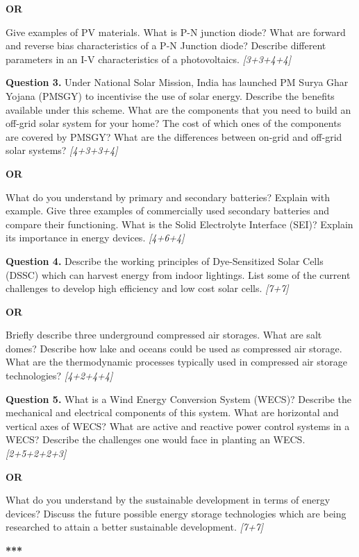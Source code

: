 \documentclass[11pt,a4paper]{article}
\newcommand{\pts}[1]{\hfill \textit{[#1]}}
\begin{document}
\begin{center}
  \textbf{OR}
\end{center}

\noindent Give examples of PV materials. What is P-N junction diode? What are forward and reverse bias characteristics of a P-N Junction diode? Describe different parameters in an I-V characteristics of a photovoltaics. \pts{3+3+4+4}

\bigskip

\noindent \textbf{Question 3.} Under National Solar Mission, India has launched PM Surya Ghar Yojana (PMSGY) to incentivise the use of solar energy. Describe the benefits available under this scheme. What are the components that you need to build an off-grid solar system for your home? The cost of which ones of the components are covered by PMSGY? What are the differences between on-grid and off-grid solar systems? \pts{4+3+3+4}

\begin{center}
  \textbf{OR}
\end{center}

\noindent What do you understand by primary and secondary batteries? Explain with example. Give three examples of commercially used secondary batteries and compare their functioning. What is the Solid Electrolyte Interface (SEI)? Explain its importance in energy devices. \pts{4+6+4}

\bigskip

\noindent \textbf{Question 4.} Describe the working principles of Dye-Sensitized Solar Cells (DSSC) which can harvest energy from indoor lightings. List some of the current challenges to develop high efficiency and low cost solar cells. \pts{7+7}

\begin{center}
  \textbf{OR}
\end{center}

\noindent Briefly describe three underground compressed air storages. What are salt domes? Describe how lake and oceans could be used as compressed air storage. What are the thermodynamic processes typically used in compressed air storage technologies? \pts{4+2+4+4}

\bigskip

\noindent \textbf{Question 5.} What is a Wind Energy Conversion System (WECS)? Describe the mechanical and electrical components of this system. What are horizontal and vertical axes of WECS? What are active and reactive power control systems in a WECS? Describe the challenges one would face in planting an WECS. \pts{2+5+2+2+3}

\begin{center}
  \textbf{OR}
\end{center}

\noindent What do you understand by the sustainable development in terms of energy devices? Discuss the future possible energy storage technologies which are being researched to attain a better sustainable development. \pts{7+7}

\bigskip
\begin{center}
  \textbf{***}
\end{center}
\end{document}
